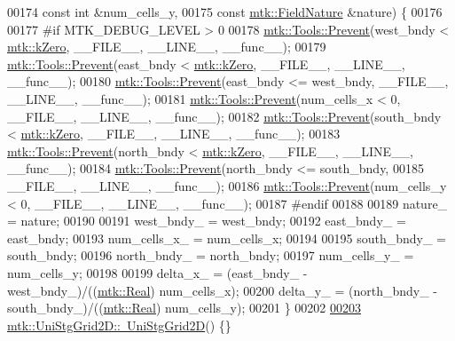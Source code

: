\begin{DoxyCode}
00174                                 \textcolor{keyword}{const} \textcolor{keywordtype}{int} &num\_cells\_y,
00175                                 \textcolor{keyword}{const} \hyperlink{group__c02-enums_ga4c54f2a329cfb4e56213b02a259d19e2}{mtk::FieldNature} &nature) \{
00176 
00177 \textcolor{preprocessor}{  #if MTK\_DEBUG\_LEVEL > 0}
00178   \hyperlink{classmtk_1_1Tools_afe5bb096309258e2e72503fd7b41c7e0}{mtk::Tools::Prevent}(west\_bndy < \hyperlink{group__c01-roots_ga59a451a5fae30d59649bcda274fea271}{mtk::kZero}, \_\_FILE\_\_, \_\_LINE\_\_, \_\_func\_\_);
00179   \hyperlink{classmtk_1_1Tools_afe5bb096309258e2e72503fd7b41c7e0}{mtk::Tools::Prevent}(east\_bndy < \hyperlink{group__c01-roots_ga59a451a5fae30d59649bcda274fea271}{mtk::kZero}, \_\_FILE\_\_, \_\_LINE\_\_, \_\_func\_\_);
00180   \hyperlink{classmtk_1_1Tools_afe5bb096309258e2e72503fd7b41c7e0}{mtk::Tools::Prevent}(east\_bndy <= west\_bndy, \_\_FILE\_\_, \_\_LINE\_\_, \_\_func\_\_);
00181   \hyperlink{classmtk_1_1Tools_afe5bb096309258e2e72503fd7b41c7e0}{mtk::Tools::Prevent}(num\_cells\_x < 0, \_\_FILE\_\_, \_\_LINE\_\_, \_\_func\_\_);
00182   \hyperlink{classmtk_1_1Tools_afe5bb096309258e2e72503fd7b41c7e0}{mtk::Tools::Prevent}(south\_bndy < \hyperlink{group__c01-roots_ga59a451a5fae30d59649bcda274fea271}{mtk::kZero}, \_\_FILE\_\_, \_\_LINE\_\_, \_\_func\_\_);
00183   \hyperlink{classmtk_1_1Tools_afe5bb096309258e2e72503fd7b41c7e0}{mtk::Tools::Prevent}(north\_bndy < \hyperlink{group__c01-roots_ga59a451a5fae30d59649bcda274fea271}{mtk::kZero}, \_\_FILE\_\_, \_\_LINE\_\_, \_\_func\_\_);
00184   \hyperlink{classmtk_1_1Tools_afe5bb096309258e2e72503fd7b41c7e0}{mtk::Tools::Prevent}(north\_bndy <= south\_bndy,
00185                       \_\_FILE\_\_, \_\_LINE\_\_, \_\_func\_\_);
00186   \hyperlink{classmtk_1_1Tools_afe5bb096309258e2e72503fd7b41c7e0}{mtk::Tools::Prevent}(num\_cells\_y < 0, \_\_FILE\_\_, \_\_LINE\_\_, \_\_func\_\_);
00187 \textcolor{preprocessor}{  #endif}
00188 
00189   nature\_ = nature;
00190 
00191   west\_bndy\_ = west\_bndy;
00192   east\_bndy\_ = east\_bndy;
00193   num\_cells\_x\_ = num\_cells\_x;
00194 
00195   south\_bndy\_ = south\_bndy;
00196   north\_bndy\_ = north\_bndy;
00197   num\_cells\_y\_ = num\_cells\_y;
00198 
00199   delta\_x\_ = (east\_bndy\_ - west\_bndy\_)/((\hyperlink{group__c01-roots_gac080bbbf5cbb5502c9f00405f894857d}{mtk::Real}) num\_cells\_x);
00200   delta\_y\_ = (north\_bndy\_ - south\_bndy\_)/((\hyperlink{group__c01-roots_gac080bbbf5cbb5502c9f00405f894857d}{mtk::Real}) num\_cells\_y);
00201 \}
00202 
\hypertarget{mtk__uni__stg__grid__2d_8cc_source_l00203}{}\hyperlink{classmtk_1_1UniStgGrid2D_a55615fed9674be8d8a48a1105e5a1476}{00203} \hyperlink{classmtk_1_1UniStgGrid2D_a55615fed9674be8d8a48a1105e5a1476}{mtk::UniStgGrid2D::~UniStgGrid2D}() \{\}

\end{DoxyCode}
